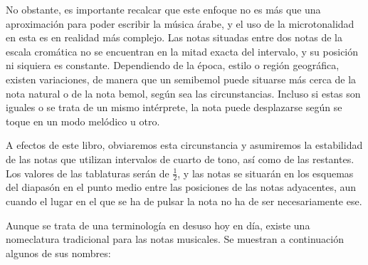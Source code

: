     No obstante, es importante recalcar que este enfoque no es más que una aproximación para poder escribir la música árabe, y el uso de la microtonalidad en esta es en realidad más complejo. Las notas situadas entre dos notas de la escala cromática no se encuentran en la mitad exacta del intervalo, y su posición ni siquiera es constante. Dependiendo de la época, estilo o región geográfica, existen variaciones, de manera que un semibemol puede situarse más cerca de la nota natural o de la nota bemol, según sea las circunstancias. Incluso si estas son iguales o se trata de un mismo intérprete, la nota puede desplazarse según se toque en un modo melódico u otro.

    A efectos de este libro, obviaremos esta circunstancia y asumiremos la estabilidad de las notas que utilizan intervalos de cuarto de tono, así como de las restantes. Los valores de las tablaturas serán de $\frac12$, y las notas se situarán en los esquemas del diapasón en el punto medio entre las posiciones de las notas adyacentes, aun cuando el lugar en el que se ha de pulsar la nota no ha de ser necesariamente ese.

    Aunque se trata de una terminología en desuso hoy en día, existe una nomeclatura tradicional para las notas musicales. Se muestran a continuación algunos de sus nombres:

